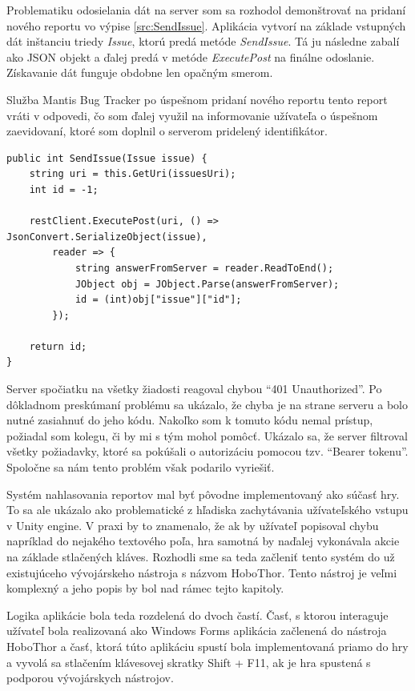 \documentclass[slovak, bachelorpractice]{diploma}
\begin{document}
Problematiku odosielania dát na server som sa rozhodol demonštrovať na pridaní nového reportu vo výpise \ref{src:SendIssue}. Aplikácia vytvorí na základe vstupných dát inštanciu triedy \textit{Issue}, ktorú predá metóde \textit{SendIssue}. Tá ju následne zabalí ako JSON objekt a ďalej predá v metóde \textit{ExecutePost} na finálne odoslanie. Získavanie dát funguje obdobne len opačným smerom. 

Služba Mantis Bug Tracker po úspešnom pridaní nového reportu tento report vráti v odpovedi, čo som ďalej využil na informovanie užívateľa o úspešnom zaevidovaní, ktoré som doplnil o serverom pridelený identifikátor.
\vspace{10pt}
\begin{lstlisting}[label=src:SendIssue,caption={Odoslanie nového reportu na server}]
public int SendIssue(Issue issue) {
	string uri = this.GetUri(issuesUri);
	int id = -1;

	restClient.ExecutePost(uri, () => JsonConvert.SerializeObject(issue),
        reader => {
            string answerFromServer = reader.ReadToEnd();
            JObject obj = JObject.Parse(answerFromServer);
            id = (int)obj["issue"]["id"];
        });

    return id;
}
\end{lstlisting}
Server spočiatku na všetky žiadosti reagoval chybou \enquote{401 Unauthorized}. Po dôkladnom preskúmaní problému sa ukázalo, že chyba je na strane serveru a bolo nutné zasiahnuť do jeho kódu. Nakoľko som k tomuto kódu nemal prístup, požiadal som kolegu, či by mi s tým mohol pomôcť. Ukázalo sa, že server filtroval všetky požiadavky, ktoré sa pokúšali o autorizáciu pomocou tzv. \enquote{Bearer tokenu}. Spoločne sa nám tento problém však podarilo vyriešiť. 

Systém nahlasovania reportov mal byť pôvodne implementovaný ako súčasť hry. To sa ale ukázalo ako problematické z hľadiska zachytávania užívateľského vstupu v Unity engine. V praxi by to znamenalo, že ak by užívateľ popisoval chybu napríklad do nejakého textového poľa, hra samotná by naďalej vykonávala akcie na základe stlačených kláves. Rozhodli sme sa teda začleniť tento systém do už existujúceho vývojárskeho nástroja s názvom HoboThor. Tento nástroj je veľmi komplexný a jeho popis by bol nad rámec tejto kapitoly.

Logika aplikácie bola teda rozdelená do dvoch častí. Časť, s ktorou interaguje užívateľ bola realizovaná ako Windows Forms aplikácia začlenená do nástroja HoboThor a časť, ktorá túto aplikáciu spustí bola implementovaná priamo do hry a vyvolá sa stlačením klávesovej skratky Shift + F11, ak je hra spustená s podporou vývojárskych nástrojov. 
\end{document}
